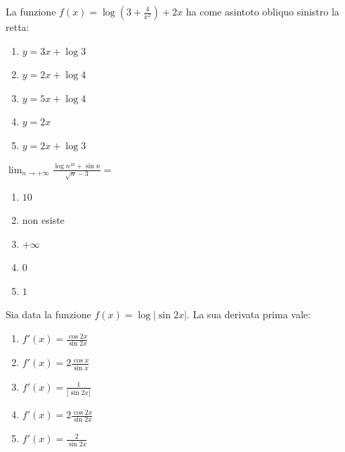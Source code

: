 \begin{quiz}
La funzione $f(x)=\log\left(3+\frac4{x^2}\right)+2x$ ha come asintoto obliquo sinistro la retta:
\begin{enumerate}
\item $y=3x+\log3$
\item $y=2x+\log4$
\item $y=5x+\log4$
\item $y=2x$
\item $y=2x+\log3$
\end{enumerate}
\end{quiz}

\begin{quiz}
$\displaystyle\lim_{n\to+\infty}\frac{\log n^{10}+\sin n}{\sqrt n-3}=$
\begin{enumerate}
\item $10$
\item non esiste
\item $+\infty$
\item $0$
\item $1$
\end{enumerate}
\end{quiz}

\begin{quiz}
Sia data la funzione $f(x)=\log|\sin2x|$. La sua derivata prima vale:
\begin{enumerate}
\item $f\prime(x)=\frac{\cos2x}{\sin2x}$
\item $f\prime(x)=2\frac{\cos x}{\sin x}$
\item $f\prime(x)=\frac1{|\sin2x|}$
\item $f\prime(x)=2\frac{\cos2x}{\sin2x}$
\item $f\prime(x)=\frac2{\sin2x}$
\end{enumerate}
\end{quiz}

